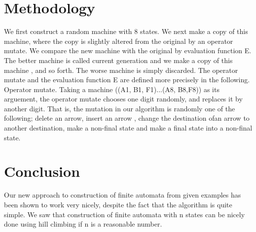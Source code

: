 \documentclass[14pt]{article}
\begin{document}
\section{Methodology}
We first construct a random machine with 8 states. We next make a copy of this machine, where the copy is slightly altered from the original by an operator mutate. We compare the new machine with the original by evaluation function E. The better machine is called current generation and we make a copy of this machine , and so forth. The worse machine is simply discarded. The operator mutate and the evaluation function E  are defined more precisely in the following.
Operator mutate. Taking a machine ((A1, B1, F1)...(A8, B8,F8)) as its arguement, the operator mutate chooses one digit  randomly, and replaces it by another digit. That is, the mutation in our algorithm is randomly  one of the following; delete an arrow, insert an arrow , change the destination ofan arrow to another destination, make a non-final state and make a final state into a non-final state. 
\section{Conclusion}
Our new approach to construction of finite automata from given examples has been shown to work very nicely, despite the fact that the algorithm is quite simple. We saw that construction of finite automata with n states can be nicely done using hill climbing if n is a reasonable number.  
\end{document}
